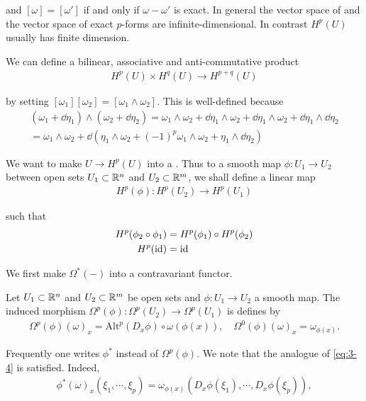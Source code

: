 and $[\omega] = [\omega']$ if and only if $\omega-\omega'$ is exact. In general the vector space of  
and the vector space of exact $p$-forms are infinite-dimensional. In contrast $H^p(U)$ usually has finite dimension.

We can define a bilinear, associative and anti-commutative product 
\begin{align}\label{eq:3-3}
  H^p(U)\times H^q(U)\to H^{p+q}(U)
\end{align}

by setting $[\omega_1][\omega_2] = [\omega_1\wedge\omega_2]$. This is well-defined because
\begin{align*}
  (\omega_1+\dd\eta_1)\wedge(\omega_2+\dd\eta_2)
  = \omega_1\wedge\omega_2 + \dd\eta_1\wedge\omega_2 + \dd\eta_1\wedge\omega_2 + \dd\eta_1\wedge\dd\eta_2 \\
  = \omega_1\wedge\omega_2 + \dd(\eta_1\wedge\omega_2 + (-1)^p\omega_1\wedge\omega_2 + \eta_1\wedge\dd\eta_2)
\end{align*}

We want to make $U\to H^p(U)$ into a . Thus to a smooth
map $\phi:U_1\to U_2$ between open sets $U_1\subset\mathbb{R}^n$ and $U_2\subset\mathbb{R}^m$, we shall define
a linear map
\begin{align*}
  H^p(\phi): H^p(U_2)\to H^p(U_1)
\end{align*}

such that 
\begin{align}\label{eq:3-4}
\begin{aligned}
  H^p(\phi_2\circ\phi_1) & = H^p(\phi_1)\circ H^p(\phi_2)\\
H^p(\operatorname{id}) & = \operatorname{id}
\end{aligned}
\end{align}

We first make $\Omega^*(-)$ into a contravariant functor.

\begin{definition}\label{def:3-10}
  Let $U_1\subset\mathbb{R}^n$ and $U_2\subset\mathbb{R}^m$ be open sets and $\phi:U_1\to U_2$ a 
  smooth map. The induced morphism $\Omega^p(\phi):\Omega^p(U_2)\to \Omega^p(U_1)$ is defines by 
  \begin{align*}
    \Omega^p(\phi)(\omega)_x=\mathrm{Alt}^p(D_x\phi)\circ\omega(\phi(x)),\quad\Omega^0(\phi)(\omega)_x=\omega_{\phi(x)}.    
  \end{align*}
\end{definition}

Frequently one writes $\phi^*$ instead of $\Omega^p(\phi)$. We note that the analogue of \eqref{eq:3-4} is 
satisfied. Indeed,
\begin{align*}
  \phi^*(\omega)_x(\xi_1,\cdots,\xi_p)=\omega_{\phi(x)}(D_x\phi(\xi_1),\cdots,D_x\phi(\xi_p)),
\end{align*}

